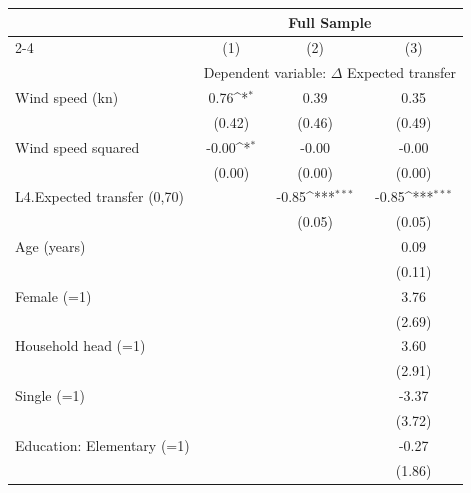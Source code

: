 {
\def\sym#1{\ifmmode^{#1}\else\(^{#1}\)\fi}
\begin{tabular}{l*{3}{c}}
\toprule
                    &\multicolumn{3}{c}{Full Sample}                                  \\\cmidrule(lr){2-4}
                    &\multicolumn{1}{c}{(1)}         &\multicolumn{1}{c}{(2)}         &\multicolumn{1}{c}{(3)}         \\
& \multicolumn{3}{c}{Dependent variable: \(\Delta\) Expected transfer} \\
\midrule
Wind speed (kn)     &        0.76\sym{*}  &        0.39         &        0.35         \\
                    &      (0.42)         &      (0.46)         &      (0.49)         \\
Wind speed squared  &       -0.00\sym{*}  &       -0.00         &       -0.00         \\
                    &      (0.00)         &      (0.00)         &      (0.00)         \\
L4.Expected transfer (0,70)&                     &       -0.85\sym{***}&       -0.85\sym{***}\\
                    &                     &      (0.05)         &      (0.05)         \\
Age (years)         &                     &                     &        0.09         \\
                    &                     &                     &      (0.11)         \\
Female (=1)         &                     &                     &        3.76         \\
                    &                     &                     &      (2.69)         \\
Household head (=1) &                     &                     &        3.60         \\
                    &                     &                     &      (2.91)         \\
Single (=1)         &                     &                     &       -3.37         \\
                    &                     &                     &      (3.72)         \\
Education: Elementary (=1)&                     &                     &       -0.27         \\
                    &                     &                     &      (1.86)         \\

\end{tabular}}
